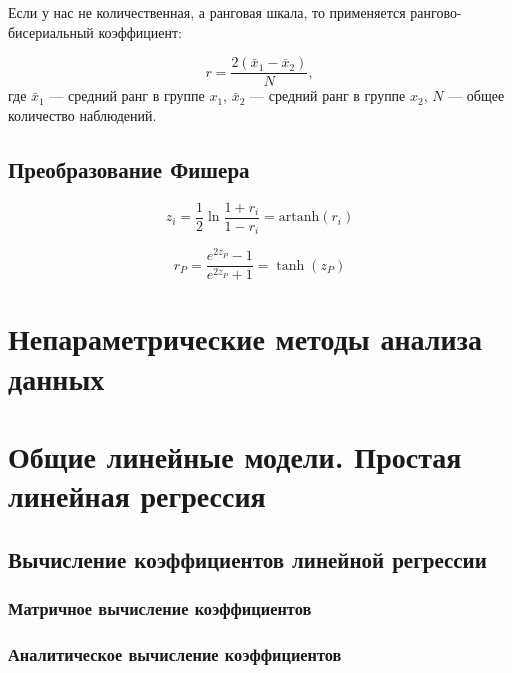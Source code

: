 \documentclass[
  letterpaper,
]{scrbook}
\newcommand{\artanh}{\text{artanh}}
\theoremstyle{definition}
\theoremstyle{remark}
\begin{document}
Если у нас не количественная, а ранговая шкала, то применяется
рангово-бисериальный коэффициент:

\[
r = \frac{2(\bar x_1 - \bar x_2)}{N},
\] где \(\bar x_1\) --- средний ранг в группе \(x_1\), \(\bar x_2\) ---
средний ранг в группе \(x_2\), \(N\) --- общее количество наблюдений.

\section{Преобразование Фишера}\label{andan-cor-fisher-transform}

\[
z_i = \frac{1}{2} \ln \frac{1 + r_i}{1 - r_i} = \artanh (r_i)
\]

\[
r_P = \dfrac{e^{2z_P} - 1}{e^{2z_P} + 1} = \tanh(z_P)
\]


\chapter{Непараметрические методы анализа данных}\label{andan-nonparam}


\chapter{Общие линейные модели. Простая линейная
регрессия}\label{andan-simplelinear}

\section{Вычисление коэффициентов линейной
регрессии}\label{ux432ux44bux447ux438ux441ux43bux435ux43dux438ux435-ux43aux43eux44dux444ux444ux438ux446ux438ux435ux43dux442ux43eux432-ux43bux438ux43dux435ux439ux43dux43eux439-ux440ux435ux433ux440ux435ux441ux441ux438ux438}

\subsection{Матричное вычисление
коэффициентов}\label{ux43cux430ux442ux440ux438ux447ux43dux43eux435-ux432ux44bux447ux438ux441ux43bux435ux43dux438ux435-ux43aux43eux44dux444ux444ux438ux446ux438ux435ux43dux442ux43eux432}

\subsection{Аналитическое вычисление
коэффициентов}\label{ux430ux43dux430ux43bux438ux442ux438ux447ux435ux441ux43aux43eux435-ux432ux44bux447ux438ux441ux43bux435ux43dux438ux435-ux43aux43eux44dux444ux444ux438ux446ux438ux435ux43dux442ux43eux432}
\end{document}
